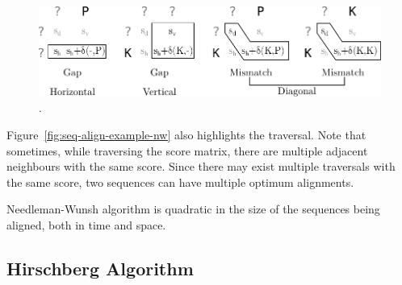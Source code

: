 \begin{figure}[h]
  \centering
  \includegraphics[scale=0.8]{src/background/figs/seq-align-rules}
  \caption{.}
  \label{fig:seq-align-rules}
\end{figure}


Figure~\ref{fig:seq-align-example-nw} also highlights the traversal. 
Note that sometimes, while traversing the score matrix, there are multiple adjacent neighbours with the same score.
Since there may exist multiple traversals with the same score, two sequences can have multiple optimum alignments.

Needleman-Wunsh algorithm is quadratic in the size of the sequences being aligned, both in time and space.

\subsection{Hirschberg Algorithm}
